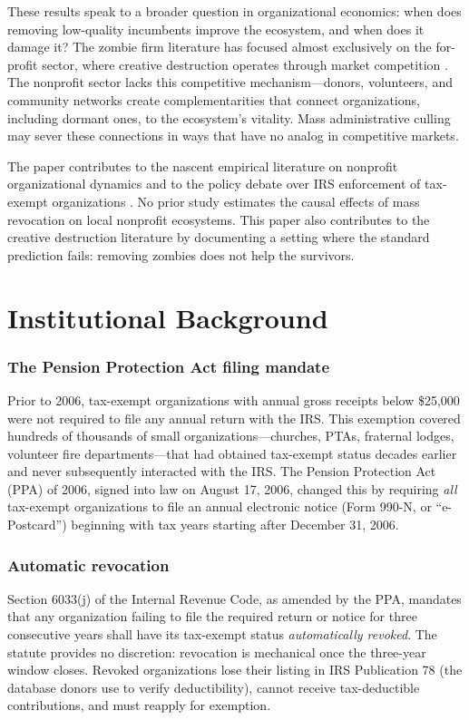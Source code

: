 \documentclass[12pt]{article}
\begin{document}
These results speak to a broader question in organizational economics: when does removing low-quality incumbents improve the ecosystem, and when does it damage it? The zombie firm literature has focused almost exclusively on the for-profit sector, where creative destruction operates through market competition \citep{caballero2008zombie, mcgowan2018walking}. The nonprofit sector lacks this competitive mechanism---donors, volunteers, and community networks create complementarities that connect organizations, including dormant ones, to the ecosystem's vitality. Mass administrative culling may sever these connections in ways that have no analog in competitive markets.

The paper contributes to the nascent empirical literature on nonprofit organizational dynamics \citep{harrison2010does, calabrese2013running} and to the policy debate over IRS enforcement of tax-exempt organizations \citep{boris2010scope}. No prior study estimates the causal effects of mass revocation on local nonprofit ecosystems. This paper also contributes to the creative destruction literature by documenting a setting where the standard prediction fails: removing zombies does not help the survivors.

\section{Institutional Background}

\subsubsection*{The Pension Protection Act filing mandate}
Prior to 2006, tax-exempt organizations with annual gross receipts below \$25,000 were not required to file any annual return with the IRS. This exemption covered hundreds of thousands of small organizations---churches, PTAs, fraternal lodges, volunteer fire departments---that had obtained tax-exempt status decades earlier and never subsequently interacted with the IRS. The Pension Protection Act (PPA) of 2006, signed into law on August 17, 2006, changed this by requiring \emph{all} tax-exempt organizations to file an annual electronic notice (Form 990-N, or ``e-Postcard'') beginning with tax years starting after December 31, 2006.

\subsubsection*{Automatic revocation}
Section 6033(j) of the Internal Revenue Code, as amended by the PPA, mandates that any organization failing to file the required return or notice for three consecutive years shall have its tax-exempt status \emph{automatically revoked}. The statute provides no discretion: revocation is mechanical once the three-year window closes. Revoked organizations lose their listing in IRS Publication 78 (the database donors use to verify deductibility), cannot receive tax-deductible contributions, and must reapply for exemption.
\end{document}
